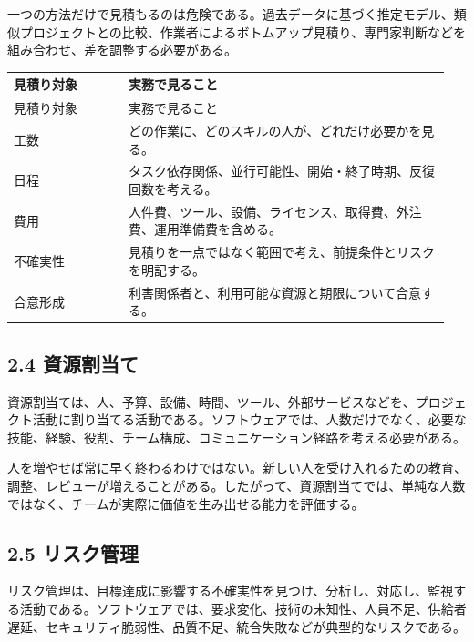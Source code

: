 \documentclass[a4paper,11pt]{ltjsarticle}
\begin{document}
一つの方法だけで見積もるのは危険である。過去データに基づく推定モデル、類似プロジェクトとの比較、作業者によるボトムアップ見積り、専門家判断などを組み合わせ、差を調整する必要がある。

\begin{longtable}{>{\raggedright\arraybackslash}p{0.25\linewidth}>{\raggedright\arraybackslash}p{0.70\linewidth}}
\toprule
見積り対象 & 実務で見ること \\
\midrule
\endfirsthead
\toprule
見積り対象 & 実務で見ること \\
\midrule
\endhead
工数 & どの作業に、どのスキルの人が、どれだけ必要かを見る。 \\
日程 & タスク依存関係、並行可能性、開始・終了時期、反復回数を考える。 \\
費用 & 人件費、ツール、設備、ライセンス、取得費、外注費、運用準備費を含める。 \\
不確実性 & 見積りを一点ではなく範囲で考え、前提条件とリスクを明記する。 \\
合意形成 & 利害関係者と、利用可能な資源と期限について合意する。 \\
\bottomrule
\end{longtable}

\begin{center}
\end{center}

\subsection{2.4 資源割当て}
資源割当ては、人、予算、設備、時間、ツール、外部サービスなどを、プロジェクト活動に割り当てる活動である。ソフトウェアでは、人数だけでなく、必要な技能、経験、役割、チーム構成、コミュニケーション経路を考える必要がある。

人を増やせば常に早く終わるわけではない。新しい人を受け入れるための教育、調整、レビューが増えることがある。したがって、資源割当てでは、単純な人数ではなく、チームが実際に価値を生み出せる能力を評価する。

\subsection{2.5 リスク管理}
リスク管理は、目標達成に影響する不確実性を見つけ、分析し、対応し、監視する活動である。ソフトウェアでは、要求変化、技術の未知性、人員不足、供給者遅延、セキュリティ脆弱性、品質不足、統合失敗などが典型的なリスクである。
\end{document}
